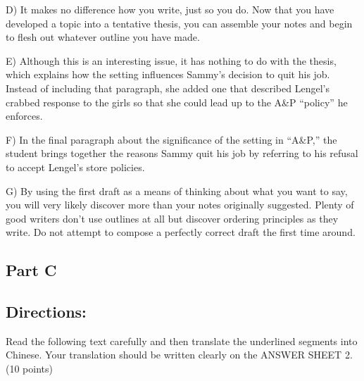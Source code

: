 \documentclass[UTF8,11pt]{ctexart}
\begin{document}
D) It makes no difference how you write, just so you do. Now that you have developed a topic into a tentative thesis, you can assemble your notes and begin to flesh out whatever outline you have made.


E) Although this is an interesting issue, it has nothing to do with the thesis, which explains how the setting influences Sammy’s decision to quit his job. Instead of including that paragraph, she added one that described Lengel’s crabbed response to the girls so that she could lead up to the A\&P “policy” he enforces.


F) In the final paragraph about the significance of the setting in “A\&P,” the student brings together the reasons Sammy quit his job by referring to his refusal to accept Lengel’s store policies.


G) By using the first draft as a means of thinking about what you want to say, you will very likely discover more than your notes originally suggested. Plenty of good writers don’t use outlines at all but discover ordering principles as they write. Do not attempt to compose a perfectly correct draft the first time around.


\subsection*{\textbf{Part C}}


\subsection*{\textbf{Directions:}}


Read the following text carefully and then translate the underlined segments into Chinese. Your translation should be written clearly on the ANSWER SHEET 2. (10 points)
\end{document}
